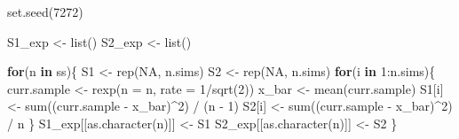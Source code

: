 \documentclass[
]{article}
\newenvironment{Shaded}{\begin{snugshade}}{\end{snugshade}}
\newcommand{\AttributeTok}[1]{\textcolor[rgb]{0.40,0.45,0.13}{#1}}
\newcommand{\ConstantTok}[1]{\textcolor[rgb]{0.56,0.35,0.01}{#1}}
\newcommand{\ControlFlowTok}[1]{\textcolor[rgb]{0.00,0.23,0.31}{\textbf{#1}}}
\newcommand{\DecValTok}[1]{\textcolor[rgb]{0.68,0.00,0.00}{#1}}
\newcommand{\FunctionTok}[1]{\textcolor[rgb]{0.28,0.35,0.67}{#1}}
\newcommand{\NormalTok}[1]{\textcolor[rgb]{0.00,0.23,0.31}{#1}}
\newcommand{\OtherTok}[1]{\textcolor[rgb]{0.00,0.23,0.31}{#1}}
\newcommand{\SpecialCharTok}[1]{\textcolor[rgb]{0.37,0.37,0.37}{#1}}
\begin{document}
\begin{Shaded}
\begin{Highlighting}[numbers=left,,]
\FunctionTok{set.seed}\NormalTok{(}\DecValTok{7272}\NormalTok{)}

\NormalTok{S1\_exp }\OtherTok{\textless{}{-}} \FunctionTok{list}\NormalTok{()}
\NormalTok{S2\_exp }\OtherTok{\textless{}{-}} \FunctionTok{list}\NormalTok{()}

\ControlFlowTok{for}\NormalTok{(n }\ControlFlowTok{in}\NormalTok{ ss)\{}
\NormalTok{  S1 }\OtherTok{\textless{}{-}} \FunctionTok{rep}\NormalTok{(}\ConstantTok{NA}\NormalTok{, n.sims)}
\NormalTok{  S2 }\OtherTok{\textless{}{-}} \FunctionTok{rep}\NormalTok{(}\ConstantTok{NA}\NormalTok{, n.sims)}
  \ControlFlowTok{for}\NormalTok{(i }\ControlFlowTok{in} \DecValTok{1}\SpecialCharTok{:}\NormalTok{n.sims)\{}
\NormalTok{    curr.sample }\OtherTok{\textless{}{-}} \FunctionTok{rexp}\NormalTok{(}\AttributeTok{n =}\NormalTok{ n, }\AttributeTok{rate =} \DecValTok{1}\SpecialCharTok{/}\FunctionTok{sqrt}\NormalTok{(}\DecValTok{2}\NormalTok{))}
\NormalTok{    x\_bar }\OtherTok{\textless{}{-}} \FunctionTok{mean}\NormalTok{(curr.sample)}
\NormalTok{    S1[i] }\OtherTok{\textless{}{-}} \FunctionTok{sum}\NormalTok{((curr.sample }\SpecialCharTok{{-}}\NormalTok{ x\_bar)}\SpecialCharTok{\^{}}\DecValTok{2}\NormalTok{) }\SpecialCharTok{/}\NormalTok{ (n }\SpecialCharTok{{-}} \DecValTok{1}\NormalTok{)}
\NormalTok{    S2[i] }\OtherTok{\textless{}{-}} \FunctionTok{sum}\NormalTok{((curr.sample }\SpecialCharTok{{-}}\NormalTok{ x\_bar)}\SpecialCharTok{\^{}}\DecValTok{2}\NormalTok{) }\SpecialCharTok{/}\NormalTok{ n}
\NormalTok{  \}}
\NormalTok{  S1\_exp[[}\FunctionTok{as.character}\NormalTok{(n)]] }\OtherTok{\textless{}{-}}\NormalTok{ S1}
\NormalTok{  S2\_exp[[}\FunctionTok{as.character}\NormalTok{(n)]] }\OtherTok{\textless{}{-}}\NormalTok{ S2}
\NormalTok{\}}


\end{Highlighting}
\end{Shaded}
\end{document}
